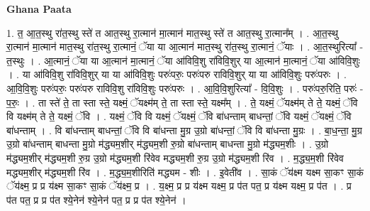 \documentclass[17pt]{extarticle}
\begin{document}
\textbf{Ghana Paata } \newline

1. त॒ आ॒त॒स्थु रा॑त॒स्थु स्ते॑ त आत॒स्थु रा॒त्मान॑ मा॒त्मान॑ मात॒स्थु स्ते॑ त आत॒स्थु रा॒त्मान᳚म् । . आ॒त॒स्थु रा॒त्मान॑ मा॒त्मान॑ मात॒स्थु रा॑त॒स्थु रा॒त्मानं॒ ॅया या आ॒त्मान॑ मात॒स्थु रा॑त॒स्थु रा॒त्मानं॒ ॅयाः । . आ॒त॒स्थुरित्या᳚ - त॒स्थुः । . आ॒त्मानं॒ ॅया या आ॒त्मान॑ मा॒त्मानं॒ ॅया आ॑विवि॒शु रा॑विवि॒शुर् या आ॒त्मान॑ मा॒त्मानं॒ ॅया आ॑विवि॒शुः । . या आ॑विवि॒शु रा॑विवि॒शुर् या या आ॑विवि॒शुः परुः॑परुः॒ परुः॑परु राविवि॒शुर् या या आ॑विवि॒शुः परुः॑परुः । . आ॒वि॒वि॒शुः परुः॑परुः॒ परुः॑परु राविवि॒शु रा॑विवि॒शुः परुः॑परुः । . आ॒वि॒वि॒शुरित्या᳚ - वि॒वि॒शुः । . परुः॑परु॒रिति॒ परुः॑ - प॒रुः॒ । . ता स्ते॑ ते॒ ता स्ता स्ते॒ यक्ष्मं॒ ॅयक्ष्म॑म् ते॒ ता स्ता स्ते॒ यक्ष्म᳚म् । . ते॒ यक्ष्मं॒ ॅयक्ष्म॑म् ते ते॒ यक्ष्मं॒ ॅवि वि यक्ष्म॑म् ते ते॒ यक्ष्मं॒ ॅवि । . यक्ष्मं॒ ॅवि वि यक्ष्मं॒ ॅयक्ष्मं॒ ॅवि बा॑धन्ताम् बाधन्तां॒ ॅवि यक्ष्मं॒ ॅयक्ष्मं॒ ॅवि बा॑धन्ताम् । . वि बा॑धन्ताम् बाधन्तां॒ ॅवि वि बा॑धन्ता मु॒ग्र उ॒ग्रो बा॑धन्तां॒ ॅवि वि बा॑धन्ता मु॒ग्रः । . बा॒ध॒न्ता॒ मु॒ग्र उ॒ग्रो बा॑धन्ताम् बाधन्ता मु॒ग्रो म॑द्ध्यम॒शीर् म॑द्ध्यम॒शी रु॒ग्रो बा॑धन्ताम् बाधन्ता मु॒ग्रो म॑द्ध्यम॒शीः । . उ॒ग्रो म॑द्ध्यम॒शीर् म॑द्ध्यम॒शी रु॒ग्र उ॒ग्रो म॑द्ध्यम॒शी रि॑वेव मद्ध्यम॒शी रु॒ग्र उ॒ग्रो म॑द्ध्यम॒शी रि॑व । . म॒द्ध्य॒म॒शी रि॑वेव मद्ध्यम॒शीर् म॑द्ध्यम॒शी रि॑व । . म॒द्ध्य॒म॒शीरिति॑ मद्ध्यम - शीः । . इ॒वेती॑व । . सा॒कं ॅय॑क्ष्म यक्ष्म सा॒कꣳ सा॒कं ॅय॑क्ष्म॒ प्र प्र य॑क्ष्म सा॒कꣳ सा॒कं ॅय॑क्ष्म॒ प्र । . य॒क्ष्म॒ प्र प्र य॑क्ष्म यक्ष्म॒ प्र प॑त पत॒ प्र य॑क्ष्म यक्ष्म॒ प्र प॑त । . प्र प॑त पत॒ प्र प्र प॑त श्ये॒नेन॑ श्ये॒नेन॑ पत॒ प्र प्र प॑त श्ये॒नेन॑ । \newline
\end{document}
